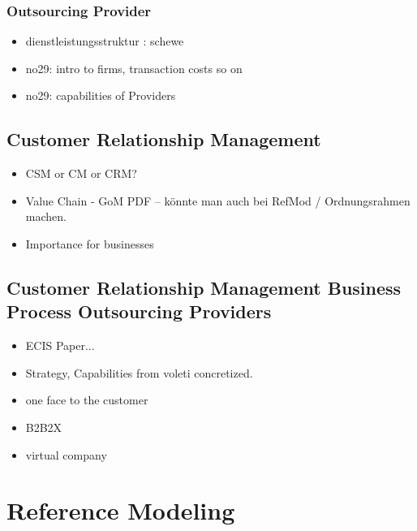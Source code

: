 		\subsubsection{Outsourcing Provider}
		\begin{itemize}
			\item dienstleistungsstruktur  : schewe
			\item no29: intro to firms, transaction costs so on
			\item no29: capabilities of Providers
		\end{itemize}
		\subsection{Customer Relationship Management}
		\begin{itemize}
			\item CSM or CM or CRM?
			\item Value Chain - GoM PDF -- könnte man auch bei RefMod / Ordnungsrahmen machen. 			
			\item Importance for businesses
		\end{itemize}
		\subsection{Customer Relationship Management Business Process Outsourcing Providers}
		\begin{itemize}
			\item ECIS Paper...
			\item Strategy, Capabilities from voleti concretized. 
			\item one face to the customer
			\item B2B2X
			\item virtual company
		\end{itemize}
	\section{Reference Modeling}
